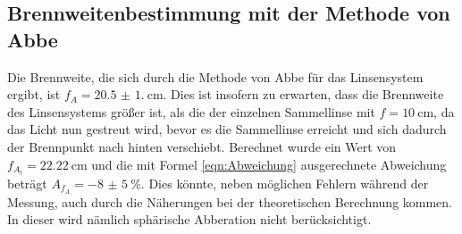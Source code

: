 \subsection{Brennweitenbestimmung mit der Methode von Abbe}
Die Brennweite, die sich durch die Methode von Abbe für das Linsensystem ergibt, ist $f_A=\qty{20.5(1.0)}{\centi\meter}$.
Dies ist insofern zu erwarten, dass die Brennweite des Linsensystems größer ist, als die der einzelnen Sammellinse mit $f=\qty{10}{\centi\meter}$,
da das Licht nun gestreut wird, bevor es die Sammellinse erreicht und sich dadurch der Brennpunkt nach hinten verschiebt.
Berechnet wurde ein Wert von $f_A_t=\qty{22.22}{\centi\meter}$ und die mit Formel \ref{eqn:Abweichung} ausgerechnete Abweichung beträgt $A_{f_A}=\qty{-8(5)}{\percent}$.
Dies könnte, neben möglichen Fehlern während der Messung, auch durch die Näherungen bei der theoretischen Berechnung kommen.
In dieser wird nämlich sphärische Abberation nicht berücksichtigt.
